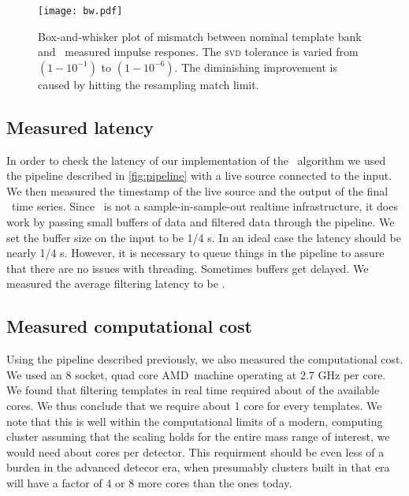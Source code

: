 \begin{figure}
	\label{fig:hist-svd-tolerance}
	\begin{center}
		\texttt{[image: bw.pdf]}
		\caption{Box-and-whisker plot of mismatch between nominal
template bank and \lloid\ measured impulse respones.  The \textsc{svd}
tolerance is varied from $\left(1-10^{-1}\right)$ to $\left(1-10^{-6}\right)$.
The diminishing improvement is caused by hitting the resampling match limit.}
	\end{center}
\end{figure}


\subsection{Measured latency}

In order to check the latency of our implementation of the \lloid\ algorithm we
used the pipeline described in \ref{fig:pipeline} with a live source connected
to the input.  We then measured the timestamp of the live source and the output
of the final \SNR\ time series.  Since \gstreamer\ is not a
sample-in-sample-out realtime infrastructure, it does work by passing small
buffers of data and filtered data through the pipeline.  We set the buffer size
on the input to be 1/4 s.  In an ideal case the latency should be nearly 1/4 s.
However, it is necessary to queue things in the pipeline to assure that there
are no issues with threading. Sometimes buffers get delayed.  We measured the
average filtering latency to be .

\subsection{Measured computational cost}

Using the pipeline described previously, we also measured the computational
cost.  We used an 8 socket, quad core AMD\texttrademark\ machine operating at
2.7 GHz per core.  We found that filtering  templates in real time
required about  of the available cores.  We thus conclude that we
require about 1 core for every  templates.  We note that this is
well within the computational limits of a modern, computing cluster assuming
that the scaling holds for the entire mass range of interest, we would need
about  cores per detector.  This requirment should be even less of a
burden in the advanced detecor era, when presumably clusters built in that era
will have a factor of 4 or 8 more cores than the ones today. 

